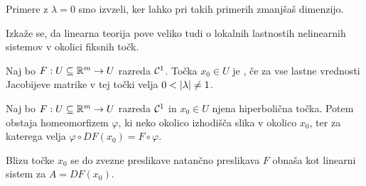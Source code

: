 \begin{opomba}
  Primere z $\lambda = 0$ smo izvzeli, ker lahko pri takih primerih zmanjšaš
  dimenzijo.
\end{opomba}

Izkaže se, da linearna teorija pove veliko tudi o lokalnih lastnostih
nelinearnih sistemov v okolici fiksnih točk.

\begin{definicija}
  Naj bo $F: U \subseteq \mathbb{R}^m \to U$ razreda $\mathcal{C}^{1}$.
  Točka $x_0 \in U$ je , če za vse lastne vrednosti
  Jacobijeve matrike v tej točki velja $0 < \left| \lambda \right| \ne 1$.
\end{definicija}

\begin{izrek}
  Naj bo $F: U \subseteq \mathbb{R}^m \to U$ razreda $\mathcal{C}^{1}$ in $x_0 \in U$ njena
  hiperbolična točka.
  Potem obstaja homeomorfizem $\varphi$, ki neko okolico izhodišča slika v
  okolico $x_0$, ter za katerega velja $\varphi \circ DF(x_0) = F \circ
  \varphi$.
\end{izrek}

\begin{opomba}
  Blizu točke $x_0$ se do zvezne preslikave natančno preslikava $F$ obnaša kot
  linearni sistem za $A = DF(x_0)$.
\end{opomba}

